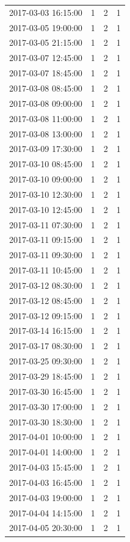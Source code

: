\begin{tabular}{lrrr}
2017-03-03 16:15:00 & 1 & 2 & 1 \\
2017-03-05 19:00:00 & 1 & 2 & 1 \\
2017-03-05 21:15:00 & 1 & 2 & 1 \\
2017-03-07 12:45:00 & 1 & 2 & 1 \\
2017-03-07 18:45:00 & 1 & 2 & 1 \\
2017-03-08 08:45:00 & 1 & 2 & 1 \\
2017-03-08 09:00:00 & 1 & 2 & 1 \\
2017-03-08 11:00:00 & 1 & 2 & 1 \\
2017-03-08 13:00:00 & 1 & 2 & 1 \\
2017-03-09 17:30:00 & 1 & 2 & 1 \\
2017-03-10 08:45:00 & 1 & 2 & 1 \\
2017-03-10 09:00:00 & 1 & 2 & 1 \\
2017-03-10 12:30:00 & 1 & 2 & 1 \\
2017-03-10 12:45:00 & 1 & 2 & 1 \\
2017-03-11 07:30:00 & 1 & 2 & 1 \\
2017-03-11 09:15:00 & 1 & 2 & 1 \\
2017-03-11 09:30:00 & 1 & 2 & 1 \\
2017-03-11 10:45:00 & 1 & 2 & 1 \\
2017-03-12 08:30:00 & 1 & 2 & 1 \\
2017-03-12 08:45:00 & 1 & 2 & 1 \\
2017-03-12 09:15:00 & 1 & 2 & 1 \\
2017-03-14 16:15:00 & 1 & 2 & 1 \\
2017-03-17 08:30:00 & 1 & 2 & 1 \\
2017-03-25 09:30:00 & 1 & 2 & 1 \\
2017-03-29 18:45:00 & 1 & 2 & 1 \\
2017-03-30 16:45:00 & 1 & 2 & 1 \\
2017-03-30 17:00:00 & 1 & 2 & 1 \\
2017-03-30 18:30:00 & 1 & 2 & 1 \\
2017-04-01 10:00:00 & 1 & 2 & 1 \\
2017-04-01 14:00:00 & 1 & 2 & 1 \\
2017-04-03 15:45:00 & 1 & 2 & 1 \\
2017-04-03 16:45:00 & 1 & 2 & 1 \\
2017-04-03 19:00:00 & 1 & 2 & 1 \\
2017-04-04 14:15:00 & 1 & 2 & 1 \\
2017-04-05 20:30:00 & 1 & 2 & 1 \\

\end{tabular}
